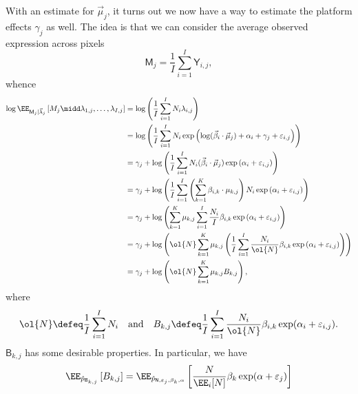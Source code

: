 \begin{enumerate}
    With an estimate for $\vec{\mu}_j$, it turns out we now have a way to estimate the platform effects $\gamma_j$ as well.
    The idea is that we can consider the average observed expression across pixels
    \[
    \mathsf{M}_j = \frac{1}{I} \sum\limits_{i=1}^{I} \mathsf{Y}_{i, j},
    \]
    whence
    \begin{align*}
        \log \EE_{\mathsf{M}_j | \vec{\lambda}_j}\left[ M_j \midd  \lambda_{1, j}, \ldots, \lambda_{I, j} \right]
        &= \log \left( \frac{1}{I} \sum\limits_{i=1}^{I} N_i \lambda_{i, j} \right)\\
        &= \log \left( \frac{1}{I} \sum\limits_{i=1}^{I} N_i \exp \left( \log (\vec{\beta}_i \cdot \vec{\mu}_j) +\alpha_i + \gamma_j + \varepsilon_{i, j} \right) \right)\\
        &= \gamma_j + \log \left( \frac{1}{I} \sum\limits_{i=1}^{I} N_i (\vec{\beta}_i \cdot \vec{\mu}_j)\exp \left( \alpha_i + \varepsilon_{i, j} \right) \right)\\
        &= \gamma_j + \log \left( \frac{1}{I} \sum\limits_{i=1}^{I} \left( \sum\limits_{k=1}^{K} \beta_{i, k}\cdot \mu_{k, j} \right)N_i \exp \left( \alpha_i + \varepsilon_{i, j} \right) \right)\\
        &= \gamma_j + \log \left( \sum\limits_{k=1}^{K} \mu_{k, j} \sum\limits_{i=1}^{I} \frac{N_i}{I} \beta_{i, k}\exp \left( \alpha_i + \varepsilon_{i, j} \right)  \right)\\
        &= \gamma_j + \log \left( \ol{N} \sum\limits_{k=1}^{K} \mu_{k, j} \left( \frac{1}{I}\sum\limits_{i=1}^{I} \frac{N_i}{\ol{N}} \beta_{i, k}\exp \left( \alpha_i + \varepsilon_{i, j} \right) \right)  \right)\\
        &= \gamma_j + \log \left( \ol{N} \sum\limits_{k=1}^{K} \mu_{k, j} B_{k, j}  \right),
    \end{align*}
    where
    \begin{align*}
        \ol{N}  \defeq \frac{1}{I} \sum\limits_{i=1}^{I} N_i \quad \text{and} \quad
        B_{k, j} \defeq \frac{1}{I} \sum\limits_{i=1}^{I} \frac{N_i}{\ol{N}} \beta_{i, k} \exp(\alpha_i+\varepsilon_{i, j}).
    \end{align*}
    $\mathsf{B}_{k, j}$ has some desirable properties. In particular, we have
    \begin{align*}
        \EE_{\hat{p}_{\mathsf{B}_{k, j}}}\left[B_{k, j}\right]
        &= 
        \EE_{\hat{p}_{\mathsf{N}, \varepsilon_{j}, \beta_k, \alpha}}\left[ \frac{N}{\EE_i[N]}\beta_k \exp(\alpha+\varepsilon_j) \right]
        \\

\end{align*}
\end{enumerate}
